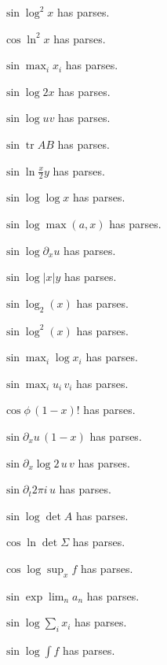 \documentclass{article}
\makeatletter
\newcommand{\countparses}{\ltx@count@parses}
\makeatother
\begin{document}
$\sin\log^2 x$ has \countparses{} parses.

$\cos\ln^2 x$ has \countparses{} parses.

$\sin\max_i x_i$ has \countparses{} parses.

$\sin\log 2x$ has \countparses{} parses.

$\sin\log uv$ has \countparses{} parses.

$\sin\operatorname{tr}AB$ has \countparses{} parses.

$\sin\ln\frac{x}{2}y$ has \countparses{} parses.

$\sin\log\log x$ has \countparses{} parses.

$\sin\log\max(a,x)$ has \countparses{} parses.

$\sin\log\partial_x u$ has \countparses{} parses.

$\sin\log|x|y$ has \countparses{} parses.

$\sin\log_2(x)$ has \countparses{} parses.

$\sin\log^2(x)$ has \countparses{} parses.

$\sin\max_i\log x_i$ has \countparses{} parses.

$\sin\max_i u_i\,v_i$ has \countparses{} parses.

$\cos\phi\,(1-x)!$ has \countparses{} parses.

$\sin\partial_x u\,(1-x)$ has \countparses{} parses.

$\sin\partial_x\log 2\,u\,v$ has \countparses{} parses.

$\sin\partial_t 2\pi i\,u$ has \countparses{} parses.

$\sin\log\det A$ has \countparses{} parses.

$\cos\ln\det\Sigma$ has \countparses{} parses.

$\cos\log\sup_x f$ has \countparses{} parses.

$\sin\exp\lim_n a_n$ has \countparses{} parses.

$\sin\log\sum_i x_i$ has \countparses{} parses.

$\sin\log\int f$ has \countparses{} parses.
\end{document}
